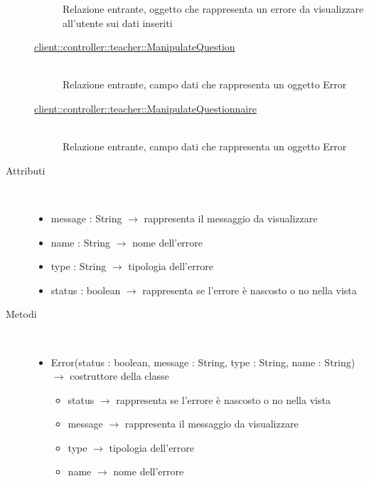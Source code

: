 \begin{description}
\begin{description}
	Relazione entrante, oggetto che rappresenta un errore da visualizzare all'utente sui dati inseriti
	\item[\hyperlink{client::controller::teacher::ManipulateQuestion}{client::controller::teacher::ManipulateQuestion}] \hfill \\
	Relazione entrante, campo dati che rappresenta un oggetto Error
	\item[\hyperlink{client::controller::teacher::ManipulateQuestionnaire}{client::controller::teacher::ManipulateQuestionnaire}] \hfill \\
	Relazione entrante, campo dati che rappresenta un oggetto Error
\end{description}

\item[Attributi] \hfill \\
\vspace{-7mm}
\begin{itemize}
	\item message : String $\rightarrow$ rappresenta il messaggio da visualizzare
	\item name : String $\rightarrow$ nome dell'errore
	\item type : String $\rightarrow$ tipologia dell'errore
	\item status : boolean $\rightarrow$ rappresenta se l'errore è nascosto o no nella vista
\end{itemize}

\item[Metodi] \hfill \\
\vspace{-7mm}
\begin{itemize}
	\item Error(status : boolean, message : String, type : String, name : String) $\rightarrow$ costruttore della classe\begin{itemize}
		\item status $\rightarrow$ rappresenta se l'errore è nascosto o no nella vista
		\item message $\rightarrow$ rappresenta il messaggio da visualizzare
		\item type $\rightarrow$ tipologia dell'errore
		\item name $\rightarrow$ nome dell'errore
	\end{itemize}
	

\end{itemize}
\end{description}
